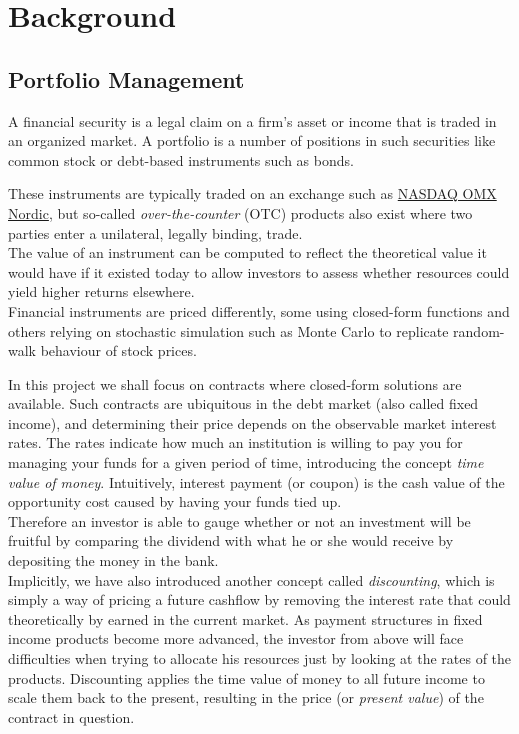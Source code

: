\chapter{Background}

\section{Portfolio Management}

A financial security is a legal claim on a firm's asset or income 
that is traded in an organized market\cite{alexander2008market}.
A portfolio is a number of positions in such securities like common
stock or debt-based instruments such as bonds.

These instruments are typically traded on an exchange such as 
\href{http://www.nasdaqomxnordic.com/}{NASDAQ OMX Nordic}, but so-called
\emph{over-the-counter} (OTC) products also exist where two parties enter
a unilateral, legally binding, trade.\\
The value of an instrument can be computed to reflect the theoretical 
value it would have if it existed today to allow investors to assess
whether resources could yield higher returns elsewhere.\\

Financial instruments are priced differently, some using closed-form functions
and others relying on stochastic simulation such as Monte Carlo to replicate 
random-walk behaviour of stock prices\cite{HULL}.

In this project we shall focus on contracts where closed-form solutions are
available. Such contracts are ubiquitous in the debt market (also called fixed
income), and determining their price depends on the observable market interest
rates. The rates indicate how much an institution is willing to pay you for
managing your funds for a given period of time, introducing the concept
\emph{time value of money}. Intuitively, interest payment (or coupon) is
the cash value of the opportunity cost caused by having your funds tied up.\\
Therefore an investor is able to gauge whether or not an investment will be
fruitful by comparing the dividend with what he or she would receive by 
depositing the money in the bank.\\
Implicitly, we have also introduced another concept called \emph{discounting},
which is simply a way of pricing a future cashflow by removing the interest
rate that could theoretically by earned in the current market. As payment structures
in fixed income products become more advanced, the investor from above will 
face difficulties when trying to allocate his resources just by looking at the
rates of the products. Discounting applies the time value of money to all
future income to scale them back to the present, resulting in the price (or
\emph{present value}) of the contract in question.\\

